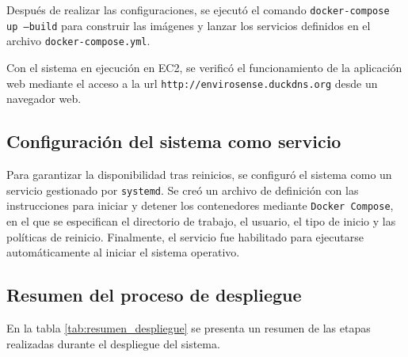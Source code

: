 Después de realizar las configuraciones, se ejecutó el comando
\texttt{docker-compose up --build} para construir las imágenes y lanzar los
servicios definidos en el archivo \texttt{docker-compose.yml}.

Con el sistema en ejecución en EC2, se verificó el funcionamiento de la
aplicación web mediante el acceso a la url
\texttt{http://envirosense.duckdns.org} desde un navegador web.

\subsection{Configuración del sistema como servicio}

Para garantizar la disponibilidad tras reinicios, se configuró el sistema como
un servicio gestionado por \texttt{systemd}. Se creó un archivo de definición
con las instrucciones para iniciar y detener los contenedores mediante
\texttt{Docker Compose}, en el que se especifican el directorio de trabajo, el
usuario, el tipo de inicio y las políticas de reinicio. Finalmente, el servicio
fue habilitado para ejecutarse automáticamente al iniciar el sistema operativo.

\subsection{Resumen del proceso de despliegue}

En la tabla \ref{tab:resumen_despliegue} se presenta un resumen de las etapas
realizadas durante el despliegue del sistema.

